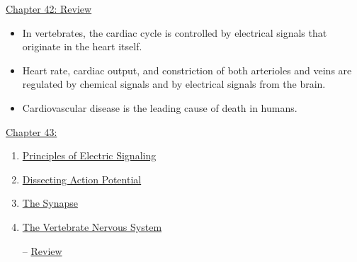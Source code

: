 \documentclass[12pt,letterpaper]{article}
\newcommand{\thetitle}{\hypertarget{home}{Animals and Ecology}}
\begin{document}
\begin{probbox}{\hyperlink{42}{Chapter 42: Review}}
{\begin{itemize}
        \item In vertebrates, the cardiac cycle is controlled by electrical signals that originate in the heart itself. 
        \item Heart rate, cardiac output, and constriction of both arterioles and veins are regulated by chemical signals and by electrical signals from the brain. 
        \item Cardiovascular disease is the leading cause of death in humans.
    \end{itemize}
}\end{probbox}


\clearpage

\renewcommand{\thetitle}{\hypertarget{43}{}}
\hypertarget{43}{}
\setcounter{section}{43}

\begin{chapbox}{\hyperlink{home}{Chapter 43:}}
    \begin{enumerate}
        \item \hyperlink{43.1}{Principles of Electric Signaling}
        \item \hyperlink{43.2}{Dissecting Action Potential}
        \item \hyperlink{43.3}{The Synapse}
        \item \hyperlink{43.4}{The Vertebrate Nervous System}
        \item [--] \hyperlink{43.r}{Review}
    \end{enumerate}
\end{chapbox}
\end{document}
